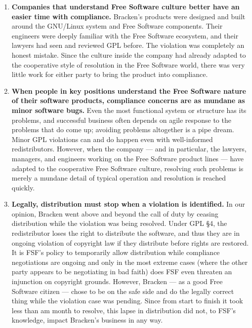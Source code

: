 \documentclass[12pt]{report}
\begin{document}
\begin{enumerate}

\item {\bf Companies that understand Free Software culture better have an
  easier time with compliance.}  Bracken's products were designed and
  built around the GNU/Linux system and Free Software components.  Their
  engineers were deeply familiar with the Free Software ecosystem, and
  their lawyers had seen and reviewed GPL before.  The violation was
  completely an honest mistake.  Since the culture inside the company had
  already adapted to the cooperative style of resolution in the Free
  Software world, there was very little work for either party to bring the
  product into compliance.

\item {\bf When people in key positions understand the Free Software
  nature of their software products, compliance concerns are as mundane as
  minor software bugs.}  Even the most functional system or structure has
  its problems, and successful business often depends on agile response to
  the problems that do come up; avoiding problems altogether is a pipe
  dream.  Minor GPL violations can and do happen even with well-informed
  redistributors.  However, when the company --- and in particular, the
  lawyers, managers, and engineers working on the Free Software product
  lines --- have adapted to the cooperative Free Software culture,
  resolving such problems is merely a mundane detail of typical operation
  and resolution is reached quickly.

\item {\bf Legally, distribution must stop when a violation is
  identified.}  In our opinion, Bracken went above and beyond the call of
  duty by ceasing distribution while the violation was being resolved.
  Under GPL \S 4, the redistributor loses the right to distribute the
  software, and thus they are in ongoing violation of copyright law if
  they distribute before rights are restored.  It is FSF's policy to
  temporarily allow distribution while compliance negotiations are ongoing
  and only in the most extreme cases (where the other party appears to be
  negotiating in bad faith) does FSF even threaten an injunction on
  copyright grounds.  However, Bracken --- as a good Free Software citizen
  --- chose to be on the safe side and do the legally correct thing while
  the violation case was pending.  Since from start to finish it took less
  than am month to resolve, this lapse in distribution did not, to FSF's
  knowledge, impact Bracken's business in any way.


\end{enumerate}
\end{document}
